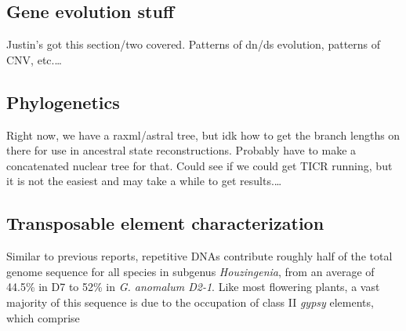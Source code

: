 \documentclass{bmcart}
\begin{document}
\subsection*{Gene evolution stuff}
Justin's got this section/two covered.  Patterns of dn/ds evolution, patterns of CNV, etc.\ldots

\subsection*{Phylogenetics}
Right now, we have a raxml/astral tree, but idk how to get the branch lengths on there for use in ancestral state reconstructions.  Probably have to make a concatenated nuclear tree for that.  Could see if we could get TICR running, but it is not the easiest and may take a while to get results.\ldots

\subsection*{Transposable element characterization}
Similar to previous reports, repetitive DNAs contribute roughly half of the total genome sequence for all species in subgenus \textit{Houzingenia}, from an average of 44.5\% in D7 to 52\% in \textit{G. anomalum D2-1}. Like most flowering plants, a vast majority of this sequence is due to the occupation of class II \textit{gypsy} elements, which comprise 
\end{document}
